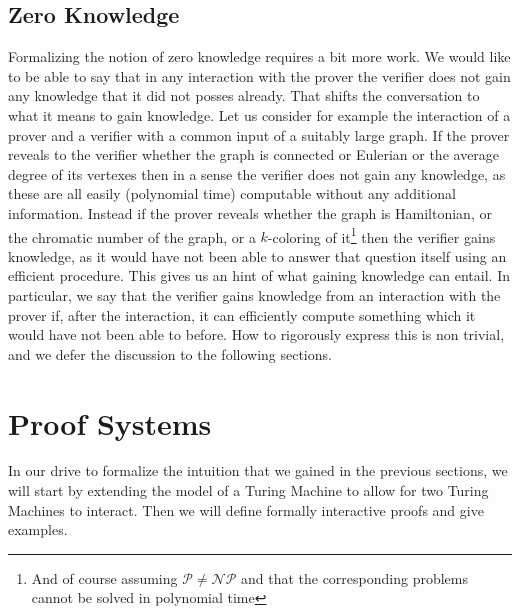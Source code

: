 \documentclass{article}
\begin{document}
\subsection{Zero Knowledge}
Formalizing the notion of zero knowledge requires a bit more work. We would like to be able to say that in any interaction with the prover the verifier does not gain any knowledge that it did not posses already. That shifts the conversation to what it means to gain knowledge. Let us consider for example the interaction of a prover and a verifier with a common input of a suitably large graph. If the prover reveals to the verifier whether the graph is connected or Eulerian or the average degree of its vertexes then in a sense the verifier does not gain any knowledge, as these are all easily (polynomial time) computable without any additional information. Instead if the prover reveals whether the graph is Hamiltonian, or the chromatic number of the graph, or a $k$-coloring of it\footnote{And of course assuming $\mathcal{P} \neq \mathcal{NP}$ and that the corresponding problems cannot be solved in polynomial time} then the verifier gains knowledge, as it would have not been able to answer that question itself using an efficient procedure. This gives us an hint of what gaining knowledge can entail. In particular, we say that the verifier gains knowledge from an interaction with the prover if, after the interaction, it can efficiently compute something which it would have not been able to before. How to rigorously express this is non trivial, and we defer the discussion to the following sections.

\section{Proof Systems}
In our drive to formalize the intuition that we gained in the previous sections, we will start by extending the model of a Turing Machine to allow for two Turing Machines to interact. Then we will define formally interactive proofs and give examples.
\end{document}
